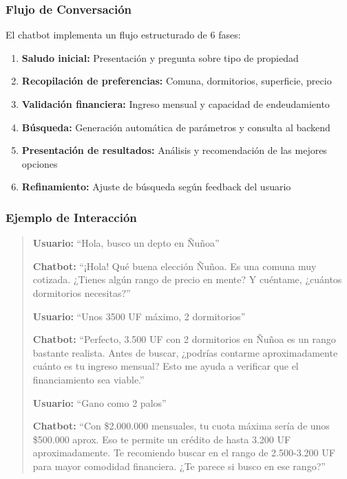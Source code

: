 \documentclass[11pt,letterpaper]{article}
\begin{document}
\subsubsection{Flujo de Conversación}

El chatbot implementa un flujo estructurado de 6 fases:

\begin{enumerate}
    \item \textbf{Saludo inicial:} Presentación y pregunta sobre tipo de propiedad
    \item \textbf{Recopilación de preferencias:} Comuna, dormitorios, superficie, precio
    \item \textbf{Validación financiera:} Ingreso mensual y capacidad de endeudamiento
    \item \textbf{Búsqueda:} Generación automática de parámetros y consulta al backend
    \item \textbf{Presentación de resultados:} Análisis y recomendación de las mejores opciones
    \item \textbf{Refinamiento:} Ajuste de búsqueda según feedback del usuario
\end{enumerate}

\subsubsection{Ejemplo de Interacción}

\begin{quote}
\textbf{Usuario:} ``Hola, busco un depto en Ñuñoa''

\textbf{Chatbot:} ``¡Hola! Qué buena elección Ñuñoa. Es una comuna muy cotizada. ¿Tienes algún rango de precio en mente? Y cuéntame, ¿cuántos dormitorios necesitas?''

\textbf{Usuario:} ``Unos 3500 UF máximo, 2 dormitorios''

\textbf{Chatbot:} ``Perfecto, 3.500 UF con 2 dormitorios en Ñuñoa es un rango bastante realista. Antes de buscar, ¿podrías contarme aproximadamente cuánto es tu ingreso mensual? Esto me ayuda a verificar que el financiamiento sea viable.''

\textbf{Usuario:} ``Gano como 2 palos''

\textbf{Chatbot:} ``Con \$2.000.000 mensuales, tu cuota máxima sería de unos \$500.000 aprox. Eso te permite un crédito de hasta 3.200 UF aproximadamente. Te recomiendo buscar en el rango de 2.500-3.200 UF para mayor comodidad financiera. ¿Te parece si busco en ese rango?''
\end{quote}
\end{document}
